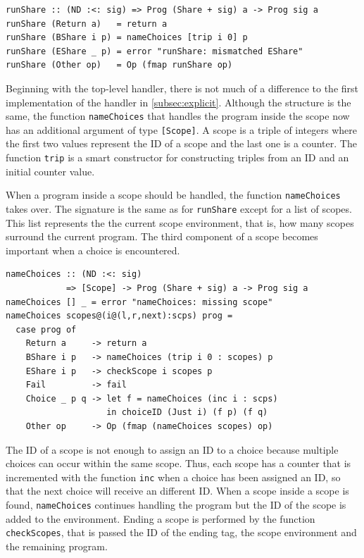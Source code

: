 \documentclass[a4paper, 11pt, fleqn, twoside, abstract=on]{scrreprt}
\newcommand{\hinl}[1]{\texttt{#1}}
\begin{document}
\begin{verbatim}
runShare :: (ND :<: sig) => Prog (Share + sig) a -> Prog sig a
runShare (Return a)   = return a
runShare (BShare i p) = nameChoices [trip i 0] p
runShare (EShare _ p) = error "runShare: mismatched EShare"
runShare (Other op)   = Op (fmap runShare op)
\end{verbatim}

Beginning with the top-level handler, there is not much of a difference to the first implementation of the handler in \autoref{subsec:explicit}.
Although the structure is the same, the function \hinl{nameChoices} that handles the program inside the scope now has an additional argument of type \hinl{[Scope]}.
A scope is a triple of integers where the first two values represent the ID of a scope and the last one is a counter.
The function \hinl{trip} is a smart constructor for constructing triples from an ID and an initial counter value.

When a program inside a scope should be handled, the function \hinl{nameChoices} takes over.
The signature is the same as for \hinl{runShare} except for a list of scopes.
This list represents the the current scope environment, that is, how many scopes surround the current program.
The third component of a scope becomes important when a choice is encountered.

\begin{verbatim}
nameChoices :: (ND :<: sig)
            => [Scope] -> Prog (Share + sig) a -> Prog sig a
nameChoices [] _ = error "nameChoices: missing scope"
nameChoices scopes@(i@(l,r,next):scps) prog =
  case prog of
    Return a     -> return a
    BShare i p   -> nameChoices (trip i 0 : scopes) p
    EShare i p   -> checkScope i scopes p
    Fail         -> fail
    Choice _ p q -> let f = nameChoices (inc i : scps)
                    in choiceID (Just i) (f p) (f q)
    Other op     -> Op (fmap (nameChoices scopes) op)
\end{verbatim}

The ID of a scope is not enough to assign an ID to a choice because multiple choices can occur within the same scope.
Thus, each scope has a counter that is incremented with the function \hinl{inc} when a choice has been assigned an ID, so that the next choice will receive an different ID.
When a scope inside a scope is found, \hinl{nameChoices} continues handling the program but the ID of the scope is added to the environment.
Ending a scope is performed by the function \hinl{checkScopes}, that is passed the ID of the ending tag, the scope environment and the remaining program.
\end{document}
